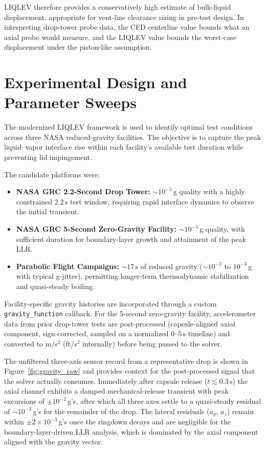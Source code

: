 \documentclass[conf]{new-aiaa}
\begin{document}
LIQLEV therefore provides a conservatively high estimate of bulk-liquid displacement, appropriate for vent-line clearance sizing in pre-test design. In interpreting drop-tower probe data, the CFD centerline value bounds what an axial probe would measure, and the LIQLEV value bounds the worst-case displacement under the piston-like assumption.

\section{Experimental Design and Parameter Sweeps}
\label{sec:exp_design_parameter_sweeps}

The modernized LIQLEV framework is used to identify optimal test conditions across three NASA reduced-gravity facilities. The objective is to capture the peak liquid--vapor interface rise within each facility's available test duration while preventing lid impingement.

The candidate platforms were:

\begin{itemize}
    \item \textbf{NASA GRC 2.2-Second Drop Tower:} $\sim 10^{-5}\,$g quality with a highly constrained $2.2\,\text{s}$ test window, requiring rapid interface dynamics to observe the initial transient.
    \item \textbf{NASA GRC 5-Second Zero-Gravity Facility:} $\sim 10^{-5}\,$g quality, with sufficient duration for boundary-layer growth and attainment of the peak LLR.
    \item \textbf{Parabolic Flight Campaigns:} $\sim 17\,\text{s}$ of reduced gravity ($\sim 10^{-2}$ to $10^{-3}\,$g with typical g-jitter), permitting longer-term thermodynamic stabilization and quasi-steady boiling.
\end{itemize}

Facility-specific gravity histories are incorporated through a custom \texttt{gravity\_function} callback. For the 5-second zero-gravity facility, accelerometer data from prior drop-tower tests are post-processed (capsule-aligned axial component, sign-corrected, sampled on a normalized $0$--$5\,\text{s}$ timeline) and converted to m/s$^2$ (ft/s$^2$ internally) before being passed to the solver.

The unfiltered three-axis sensor record from a representative drop is shown in Figure~\ref{fig:gravity_raw} and provides context for the post-processed signal that the solver actually consumes. Immediately after capsule release ($t \lesssim 0.3\,\text{s}$) the axial channel exhibits a damped mechanical-release transient with peak excursions of $\pm 10^{-2}\,$g's, after which all three axes settle to a quasi-steady residual of $\sim 10^{-3}\,$g's for the remainder of the drop. The lateral residuals ($a_y$, $a_z$) remain within $\pm 2 \times 10^{-3}\,$g's once the ringdown decays and are negligible for the boundary-layer-driven LLR analysis, which is dominated by the axial component aligned with the gravity vector.
\end{document}
